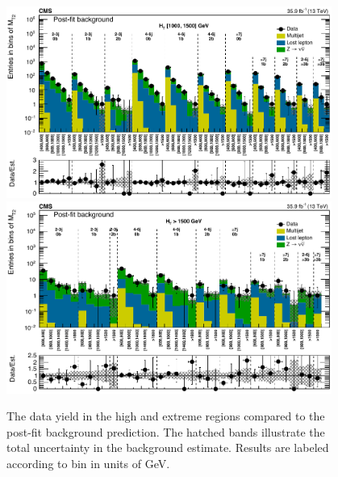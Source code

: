 \begin{figure}
	\centering
	\includegraphics[width=0.95\textwidth]{results/figs/postfit/mt2_highHT_fullEstimate}
	\includegraphics[width=0.95\textwidth]{results/figs/postfit/mt2_extremeHT_fullEstimate}
	\caption{The data yield in the high \HT and extreme \HT regions compared to the post-fit background prediction. The hatched bands illustrate the total uncertainty in the background estimate. Results are labeled according to \mttwo bin in units of GeV.}
	\label{fig:yieldPostfit3}
\end{figure}
